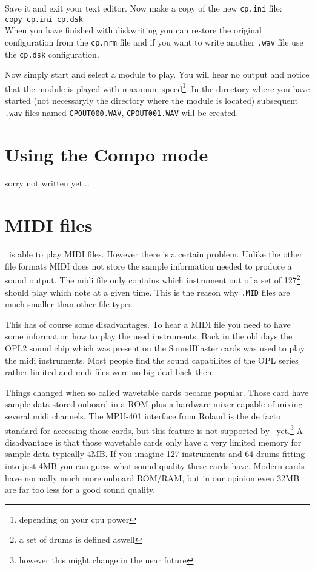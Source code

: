 Save it and exit your text editor. Now make a copy of the new 
\texttt{cp.ini} file: \\
\texttt{copy cp.ini cp.dsk}\\
When you have finished with diskwriting you can restore the original 
configuration from the \texttt{cp.nrm} file and if you want to write
another \texttt{.wav} file use the \texttt{cp.dsk} configuration.

Now simply start \cp and select a module to play. You will hear no output
and notice that the module is played with maximum speed\footnote{depending
on your cpu power}. In the directory where you have started \cp (not 
necessaryly the directory where the module is located) subsequent 
\texttt{.wav} files named \texttt{CPOUT000.WAV}, \texttt{CPOUT001.WAV} 
will be created.

\section{Using the Compo mode}
\label{compomode}
{\small sorry not written yet...}

\section{MIDI files}
\label{midi}
\cp\ is able to play MIDI files. However there is a certain problem. Unlike the
other file formats MIDI does not store the sample information needed to
produce a sound output. The midi file only contains which instrument out of a
set of 127\footnote{a set of drums is defined aswell}
should play which note at a given time. This is the reason why \texttt{.MID}
files are much smaller than other file types.

This has of course some disadvantages. To hear a MIDI file you need to have
some information how to play the used instruments. Back in the old days the
OPL2 sound chip which was present on the SoundBlaster cards was used to play
the midi instruments. Most people find the sound capabilites of the OPL series
rather limited and midi files were no big deal back then.

Things changed when so called wavetable cards became popular. Those card have
sample data stored onboard in a ROM plus a hardware mixer capable of mixing
several midi channels. The MPU-401 interface from Roland is the de facto
standard for accessing those cards, but this feature is not supported by \cp\
yet.\footnote{however this might change in the near future} A disadvantage is
that those wavetable cards only have a very limited memory for sample data
typically 4MB. If you imagine 127 instruments and 64 drums fitting into just
4MB you can guess what sound quality these cards have. Modern cards have normally
much more onboard ROM/RAM, but in our opinion even 32MB are far too less for a
good sound quality.

